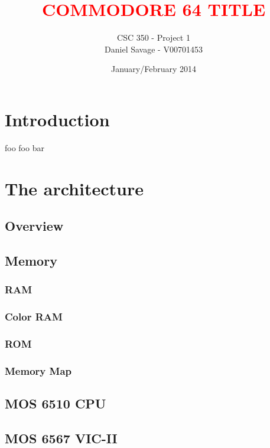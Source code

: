 \documentclass{article}
\title{\textcolor{red}{COMMODORE 64 TITLE}}
\author{CSC 350 - Project 1 \\ Daniel Savage - V00701453}
\date{January/February 2014}
\begin{document}
   \maketitle
   
\pagebreak{}

\tableofcontents

\pagebreak{}
   
\section{Introduction}
foo foo bar

\section{The architecture}

\subsection{Overview}

\subsection{Memory}

\subsubsection{RAM}

\subsubsection{Color RAM}

\subsubsection{ROM}

\subsubsection{Memory Map}

\subsection{MOS 6510 CPU}

\subsection{MOS 6567 VIC-II}
\end{document}
